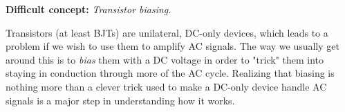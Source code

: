 \vskip 10pt

\noindent
{\bf Difficult concept: } {\it Transistor biasing.}

Transistors (at least BJTs) are unilateral, DC-only devices, which leads to a problem if we wish to use them to amplify AC signals.  The way we usually get around this is to {\it bias} them with a DC voltage in order to "trick" them into staying in conduction through more of the AC cycle.  Realizing that biasing is nothing more than a clever trick used to make a DC-only device handle AC signals is a major step in understanding how it works.

